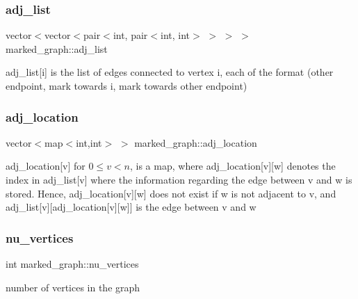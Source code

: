 \subsubsection{\texorpdfstring{adj\+\_\+list}{adj\_list}}
{\footnotesize\ttfamily vector$<$vector$<$pair$<$int, pair$<$int, int$>$ $>$ $>$ $>$ marked\+\_\+graph\+::adj\+\_\+list}



adj\+\_\+list\mbox{[}i\mbox{]} is the list of edges connected to vertex i, each of the format (other endpoint, mark towards i, mark towards other endpoint) 

\mbox{\label{classmarked__graph_a3ae722ea9583ad23af34d789a88ac01a}} 
\subsubsection{\texorpdfstring{adj\+\_\+location}{adj\_location}}
{\footnotesize\ttfamily vector$<$map$<$int,int$>$ $>$ marked\+\_\+graph\+::adj\+\_\+location}



adj\+\_\+location\mbox{[}v\mbox{]} for $0 \leq v < n$, is a map, where adj\+\_\+location\mbox{[}v\mbox{]}\mbox{[}w\mbox{]} denotes the index in adj\+\_\+list\mbox{[}v\mbox{]} where the information regarding the edge between v and w is stored. Hence, adj\+\_\+location\mbox{[}v\mbox{]}\mbox{[}w\mbox{]} does not exist if w is not adjacent to v, and adj\+\_\+list\mbox{[}v\mbox{]}\mbox{[}adj\+\_\+location\mbox{[}v\mbox{]}\mbox{[}w\mbox{]}\mbox{]} is the edge between v and w 

\mbox{\label{classmarked__graph_acf79c6aeb8f32614cb14a5baaa6c9f9b}} 
\subsubsection{\texorpdfstring{nu\+\_\+vertices}{nu\_vertices}}
{\footnotesize\ttfamily int marked\+\_\+graph\+::nu\+\_\+vertices}



number of vertices in the graph 

\mbox{\label{classmarked__graph_ac83e9377dd4d8bb95be1ac949b127296}} 
